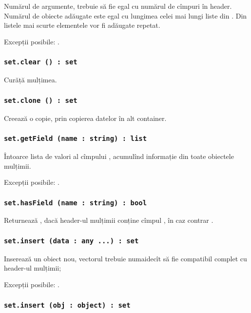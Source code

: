 Numărul de argumente, trebuie să fie egal cu numărul de cîmpuri în header. Numărul de obiecte adăugate este egal cu lungimea celei mai lungi liste din . Din listele mai scurte elementele vor fi adăugate repetat.

Excepții posibile: .

\subsubsection{\lstinline|set.clear () : set|}

Curăță mulțimea.

\subsubsection{\lstinline|set.clone () : set|}

Creează o copie, prin copierea datelor în alt container.

\subsubsection{\lstinline|set.getField (name : string) : list|}

Întoarce lista de valori al cîmpului , acumulînd informație din toate obiectele mulțimii.

Excepții posibile: .

\subsubsection{\lstinline|set.hasField (name : string) : bool|}

Returnează \true, dacă header-ul mulțimii conține cîmpul , în caz contrar \false.

\subsubsection{\lstinline|set.insert (data : any ...) : set|}

Inserează un obiect nou, vectorul  trebuie numaidecît să fie compatibil complet cu header-ul mulțimii;

Excepții posibile: .

\subsubsection{\lstinline|set.insert (obj : object) : set|}

